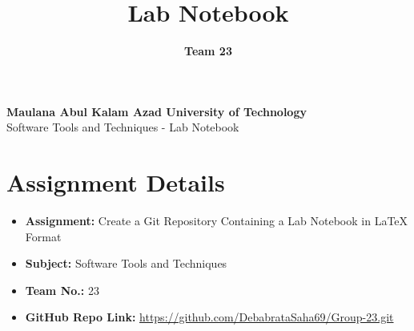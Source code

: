 \documentclass[a4paper,15pt]{article}
\title{\textbf{Lab Notebook}}
\author{\textbf{Team 23}}
\date{}
\begin{document}
\maketitle


\begin{center}
    \Large\textbf{Maulana Abul Kalam Azad University of Technology}\\
    \vspace{0.2cm}
    \large Software Tools and Techniques - Lab Notebook
\end{center}

\vspace{1cm}

\section*{Assignment Details}
\begin{itemize}[leftmargin=1.5cm]
    \item \textbf{Assignment:} Create a Git Repository Containing a Lab Notebook in LaTeX Format
    \item \textbf{Subject:} Software Tools and Techniques
    \item \textbf{Team No.:} 23
    \item \textbf{GitHub Repo Link:} \url{https://github.com/DebabrataSaha69/Group-23.git}
\end{itemize}

\vspace{1cm}
\end{document}
